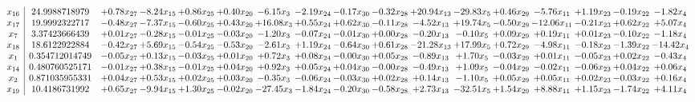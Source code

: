 \documentclass[9pt]{article}
\begin{document}
 \[\begin{array}{c| c c@{\hskip 2pt} c@{\hskip 2pt} c@{\hskip 2pt} c@{\hskip 2pt} c@{\hskip 2pt} c@{\hskip 2pt} c@{\hskip 2pt} c@{\hskip 2pt} c@{\hskip 2pt} c@{\hskip 2pt} c@{\hskip 2pt} c@{\hskip 2pt} c@{\hskip 2pt} c@{\hskip 2pt} c@{\hskip 2pt} }
 x_{16}   &  24.9988718979 & +  0.78 x_{27} & -8.24 x_{15} & +  0.86 x_{25} & +  0.40 x_{20} & -6.15 x_{3} & -2.19 x_{24} & -0.17 x_{30} & -0.32 x_{28} & + 20.94 x_{13} & -29.83 x_{5} & +  0.46 x_{29} & -5.76 x_{11} & +  1.19 x_{23} & -0.19 x_{22} & -1.82 x_{4}\\
 x_{17}   &  19.9992322717 & -0.48 x_{27} & -7.37 x_{15} & -0.60 x_{25} & +  0.43 x_{20} & + 16.08 x_{3} & +  0.55 x_{24} & +  0.62 x_{30} & -0.11 x_{28} & -4.52 x_{13} & + 19.74 x_{5} & -0.50 x_{29} & -12.06 x_{11} & -0.21 x_{23} & +  0.62 x_{22} & +  5.07 x_{4}\\
 x_{7}   &  3.37423666439 & +  0.01 x_{27} & -0.28 x_{15} & -0.01 x_{25} & -0.03 x_{20} & -1.20 x_{3} & -0.07 x_{24} & -0.01 x_{30} & +  0.00 x_{28} & -0.20 x_{13} & -0.10 x_{5} & +  0.09 x_{29} & +  0.19 x_{11} & +  0.01 x_{23} & -0.10 x_{22} & -1.18 x_{4}\\
 x_{18}   &  18.6122922884 & -0.42 x_{27} & +  5.69 x_{15} & -0.54 x_{25} & -0.53 x_{20} & -2.61 x_{3} & +  1.19 x_{24} & -0.64 x_{30} & +  0.61 x_{28} & -21.28 x_{13} & + 17.99 x_{5} & +  0.72 x_{29} & -4.98 x_{11} & -0.18 x_{23} & -1.39 x_{22} & -14.42 x_{4}\\
 x_{1}   &  0.354712014749 & -0.05 x_{27} & +  0.13 x_{15} & -0.03 x_{25} & +  0.01 x_{20} & +  0.72 x_{3} & +  0.08 x_{24} & -0.00 x_{30} & +  0.05 x_{28} & -0.89 x_{13} & +  1.70 x_{5} & -0.03 x_{29} & +  0.01 x_{11} & -0.05 x_{23} & +  0.02 x_{22} & -0.43 x_{4}\\
 x_{14}   &  0.480760525171 & -0.01 x_{27} & +  0.38 x_{15} & -0.01 x_{25} & +  0.04 x_{20} & +  0.92 x_{3} & +  0.05 x_{24} & +  0.04 x_{30} & -0.00 x_{28} & -0.49 x_{13} & +  1.09 x_{5} & -0.04 x_{29} & -0.02 x_{11} & -0.06 x_{23} & +  0.04 x_{22} & +  0.06 x_{4}\\
 x_{2}   &  0.871035955331 & +  0.04 x_{27} & +  0.53 x_{15} & +  0.02 x_{25} & +  0.03 x_{20} & -0.35 x_{3} & -0.06 x_{24} & -0.03 x_{30} & +  0.02 x_{28} & +  0.14 x_{13} & -1.10 x_{5} & +  0.05 x_{29} & +  0.05 x_{11} & +  0.02 x_{23} & -0.03 x_{22} & +  0.16 x_{4}\\
 x_{19}   &  10.4186731992 & +  0.65 x_{27} & -9.94 x_{15} & +  1.30 x_{25} & -0.02 x_{20} & -27.45 x_{3} & -1.84 x_{24} & -0.20 x_{30} & -0.58 x_{28} & +  2.73 x_{13} & -32.51 x_{5} & +  1.54 x_{29} & +  8.88 x_{11} & +  1.15 x_{23} & -1.74 x_{22} & +  4.11 x_{4}\\

\end{array}\]
\end{document}
